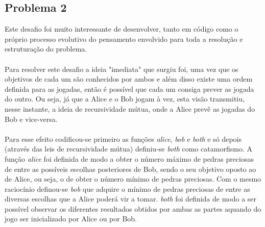 \documentclass[a4paper]{article}
\begin{document}
\subsection*{Problema 2}

Este desafio foi muito interessante de desenvolver, tanto em código como o próprio processo evolutivo do pensamento envolvido para toda a resolução e estruturação do problema.
\\
\\
Para resolver este desafio a ideia "imediata" que surgiu foi, uma vez que os objetivos de cada um são conhecidos por ambos e além disso existe uma ordem definida para as jogadas, então é possível que cada um consiga prever as jogada do outro. Ou seja, já que a Alice e o Bob jogam à vez, esta visão transmitiu, nesse instante, a ideia de recursividade mútua, onde a Alice prevê as jogadas do Bob e vice-versa. 
\\
\\
Para esse efeito codificou-se primeiro as funções \emph{alice}, \emph{bob} e \emph{both} e só depois (através das leis de recursividade mútua) definiu-se \emph{both} como catamorfismo. A função \emph{alice} foi definida de modo a obter o número máximo de pedras preciosas de entre as possíveis escolhas posteriores de Bob, sendo o seu objetivo oposto ao de Alice, ou seja, o de obter o número mínimo de pedras preciosas. Com o mesmo raciocínio definou-se \emph{bob} que adquire o mínimo de pedras preciosas de entre as diversas escolhas que a Alice poderá vir a tomar. \emph{both} foi definida de modo a ser possível observar os diferentes resultados obtidos por ambas as partes aquando do jogo ser inicializado por Alice ou por Bob.
\end{document}
